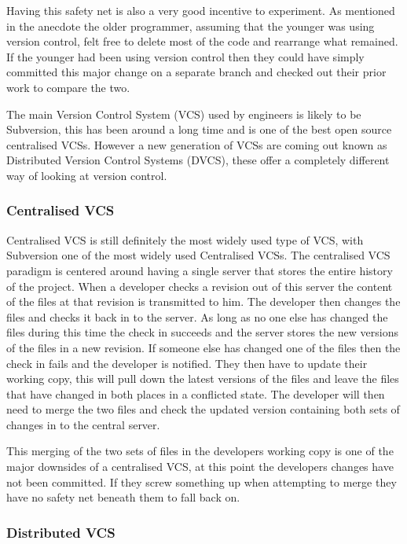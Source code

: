   Having this safety net is also a very good incentive to experiment.  As
  mentioned in the anecdote the older programmer, assuming that the younger
  was using version control, felt free to delete most of the code and
  rearrange what remained.  If the younger had been using version control then
  they could have simply committed this major change on a separate branch and
  checked out their prior work to compare the two.

  The main Version Control System (VCS) used by engineers is likely to be
  Subversion, this has been around a long time and is one of the best open
  source centralised VCSs.  However a new generation of VCSs are coming out
  known as Distributed Version Control Systems (DVCS), these offer a completely
  different way of looking at version control.

  \subsubsection{Centralised VCS}

    Centralised VCS is still definitely the most widely used type of VCS, with
    Subversion one of the most widely used Centralised VCSs.  The centralised
    VCS paradigm is centered around having a single server that stores the
    entire history of the project.  When a developer checks a revision out of
    this server the content of the files at that revision is transmitted to him.
    The developer then changes the files and checks it back in to the server.
    As long as no one else has changed the files during this time the check in
    succeeds and the server stores the new versions of the files in a new
    revision.  If someone else has changed one of the files then the check in
    fails and the developer is notified.  They then have to update their working
    copy, this will pull down the latest versions of the files and leave the
    files that have changed in both places in a conflicted state.  The developer
    will then need to merge the two files and check the updated version
    containing both sets of changes in to the central server.

    This merging of the two sets of files in the developers working copy is one
    of the major downsides of a centralised VCS, at this point the developers
    changes have not been committed.  If they screw something up when attempting
    to merge they have no safety net beneath them to fall back on.

  \subsubsection{Distributed VCS}

